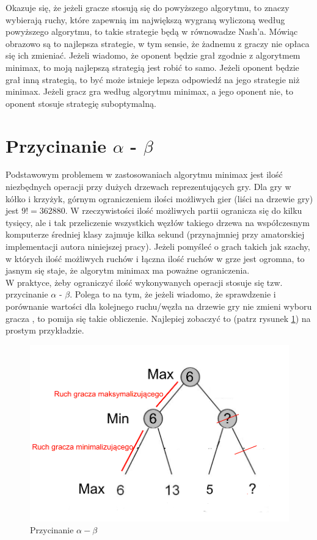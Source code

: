 \documentclass[licencjacka]{pracamgr}
\begin{document}
Okazuje się, że jeżeli gracze stosują się do powyższego algorytmu, to znaczy wybierają ruchy, które zapewnią im największą wygraną wyliczoną według powyższego algorytmu, to takie strategie będą w równowadze Nash'a. Mówiąc obrazowo są  to najlepsza strategie, w tym sensie, że żadnemu z graczy nie opłaca się ich zmieniać. Jeżeli wiadomo, że oponent będzie grał zgodnie z algorytmem minimax, to moją najlepszą strategią jest robić to samo. Jeżeli  oponent będzie grał inną strategią, to być może istnieje lepsza odpowiedź na jego strategie niż minimax. Jeżeli gracz gra według algorytmu minimax, a jego oponent nie, to oponent stosuje strategię suboptymalną. 

\section{Przycinanie $\alpha$ - $\beta$}
Podstawowym problemem w zastosowaniach algorytmu minimax jest ilość niezbędnych operacji przy dużych drzewach reprezentujących gry.  Dla gry w kółko i krzyżyk, górnym ograniczeniem ilości możliwych gier (liści na drzewie gry) jest $9! = 362880$. W rzeczywistości ilość możliwych partii ogranicza się do kilku tysięcy, ale i tak przeliczenie wszystkich węzłów takiego drzewa na współczesnym komputerze średniej klasy zajmuje kilka sekund (przynajmniej przy amatorskiej implementacji autora niniejszej pracy). Jeżeli pomyśleć o grach takich jak szachy, w których ilość możliwych ruchów i łączna ilość ruchów w grze jest ogromna, to jasnym się staje, że algorytm minimax ma poważne ograniczenia.  \\

W praktyce, żeby ograniczyć ilość wykonywanych operacji stosuje się tzw. przycinanie  $\alpha$ - $\beta$. Polega to na tym, że jeżeli wiadomo, że sprawdzenie i porównanie wartości dla kolejnego ruchu/węzła na drzewie gry nie zmieni wyboru gracza , to pomija się takie obliczenie. Najlepiej zobaczyć to (patrz rysunek \ref{Rys3}) na prostym przykładzie. 

\begin{figure}[h!]
	\includegraphics [scale=0.3] {advertise2.png}
	\caption{Przycinanie $\alpha - \beta$}
	\label{Rys3}
\end{figure}
\end{document}

